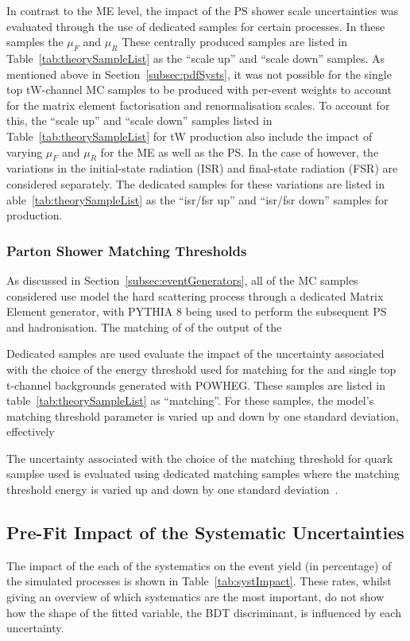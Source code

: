 In contrast to the ME level, the impact of the PS shower scale uncertainties was evaluated through the use of dedicated samples for certain processes.
In these samples the $\mu_{F}$ and $\mu_{R}$ 
These centrally produced samples are listed in Table~\ref{tab:theorySampleList} as the ``scale up'' and ``scale down'' samples. 
As mentioned above in Section~\ref{subsec:pdfSysts}, it was not possible for the single top tW-channel MC samples to be produced with per-event weights to account for the matrix element factorisation and renormalisation scales.
To account for this, the ``scale up'' and ``scale down'' samples listed in Table~\ref{tab:theorySampleList} for tW production also include the impact of varying $\mu_{F}$ and $\mu_{R}$ for the ME as well as the PS.
In the case of \ttbar however, the variations in the initial-state radiation (ISR) and final-state radiation (FSR) are considered separately.
The dedicated samples for these variations are listed in able~\ref{tab:theorySampleList} as the ``isr/fsr up'' and ``isr/fsr down'' samples for \ttbar production.

\subsubsection{Parton Shower Matching Thresholds}
As discussed in Section~\ref{subsec:eventGenerators}, all of the MC samples considered use model the hard scattering process through a dedicated Matrix Element generator, with PYTHIA 8 being used to perform the subsequent PS and hadronisation.
The matching of of the output of the 

Dedicated samples are used evaluate the impact of the uncertainty associated with the choice of the energy threshold used for matching for the \ttbar and single top t-channel backgrounds generated with POWHEG.
These samples are listed in table~\ref{tab:theorySampleList} as ``matching''.
For these samples, the model's matching threshold parameter is varied up and down by one standard deviation, effectively 

The uncertainty associated with the choice of the matching threshold for  quark samplse used is evaluated using dedicated matching samples where the matching threshold energy is varied up and down by one standard deviation~\cite{CMS:2016kle}.

\subsection{Pre-Fit Impact of the Systematic Uncertainties}\label{sec:uncertainitiesPreFitImpact}
The impact of the each of the systematics on the event yield (in percentage) of the simulated processes is shown in Table~\ref{tab:systImpact}.
These rates, whilst giving an overview of which systematics are the most important, do not show how the shape of the fitted variable, the BDT discriminant, is influenced by each uncertainty.

